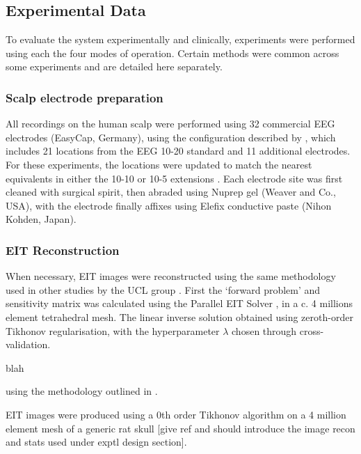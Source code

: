\subsection{Experimental Data}

To evaluate the system experimentally and clinically, experiments were performed using each the four modes of operation. Certain methods were common across some experiments and are detailed here separately. 

\subsubsection{Scalp electrode preparation}
All recordings on the human scalp were performed using 32 commercial EEG electrodes (EasyCap, Germany), using the configuration described by \citet{tidswell2001three}, which includes 21 locations from the EEG 10-20 standard \cite{Jasper1958} and 11 additional electrodes. For these experiments, the locations were updated to match the nearest equivalents in either the 10-10 or 10-5 extensions \cite{Oostenveld2001}. Each electrode site was first cleaned with surgical spirit, then abraded using Nuprep gel (Weaver and Co., USA), with the electrode finally affixes using Elefix conductive paste (Nihon Kohden, Japan). 

\subsubsection{EIT Reconstruction}
When necessary, EIT images were reconstructed using the same methodology used in other studies by the UCL group \cite{Dowrick_2016,Aristovich_2016,Aristovich_2014}. First the `forward problem' and sensitivity matrix was calculated using the Parallel EIT Solver \cite{Jehl2014}, in a c. 4 millions element tetrahedral mesh. The linear inverse solution obtained using zeroth-order Tikhonov regularisation, with the hyperparameter $\lambda$ chosen through cross-validation. 


blah

using the methodology outlined in \cite{Aristovich_2014}.


EIT images were produced using a 0th order Tikhonov algorithm on a 4 million element mesh of a generic rat skull [give ref and should introduce the image recon and stats used under exptl design section].








